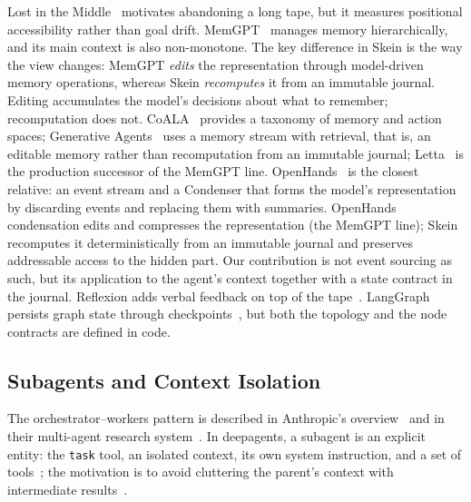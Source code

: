 \documentclass[11pt,a4paper]{article}
\begin{document}
Lost in the Middle~\cite{liu2023lost} motivates abandoning a long tape, but it measures
positional accessibility rather than goal drift. MemGPT~\cite{packer2023memgpt} manages memory
hierarchically, and its main context is also non-monotone. The key difference in Skein is the
way the view changes: MemGPT \emph{edits} the representation through model-driven memory
operations, whereas Skein \emph{recomputes} it from an immutable journal. Editing accumulates
the model's decisions about what to remember; recomputation does not. CoALA~\cite{sumers2024coala}
provides a taxonomy of memory and action spaces; Generative Agents~\cite{park2023generative}
uses a memory stream with retrieval, that is, an editable memory rather than recomputation from
an immutable journal; Letta~\cite{letta} is the production successor of the MemGPT line.
OpenHands~\cite{openhands2024,openhandsSdk2025} is the closest relative: an event stream and a
Condenser that forms the model's representation by discarding events and replacing them with
summaries. OpenHands condensation edits and compresses the representation (the MemGPT line);
Skein recomputes it deterministically from an immutable journal and preserves addressable access
to the hidden part. Our contribution is not event sourcing as such, but its application to the
agent's context together with a state contract in the journal. Reflexion adds verbal feedback on
top of the tape~\cite{shinn2023reflexion}. LangGraph persists graph state through
checkpoints~\cite{langgraphPersistence}, but both the topology and the node contracts are
defined in code.

\subsection{Subagents and Context Isolation}

The orchestrator--workers pattern is described in Anthropic's overview~\cite{anthropic2024building}
and in their multi-agent research system~\cite{anthropic2025multiagent}. In deepagents, a
subagent is an explicit entity: the \texttt{task} tool, an isolated context, its own system
instruction, and a set of tools~\cite{langchain2025deepagents}; the motivation is to avoid
cluttering the parent's context with intermediate results~\cite{dbreunig2025context}.
\end{document}
